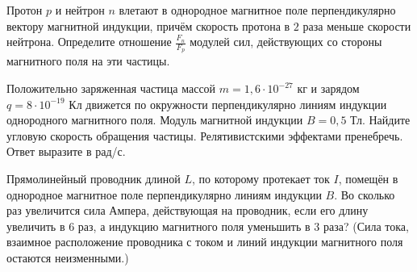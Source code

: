 \begin{taskbasic}[code={\label{task:elem_mag_proton_neutron_force}}]
Протон $p$ и нейтрон $n$ влетают в однородное магнитное поле перпендикулярно вектору магнитной индукции, причём скорость протона в $2$ раза меньше скорости нейтрона. Определите отношение $\frac{F_n}{F_p}$ модулей сил, действующих со стороны магнитного поля на эти частицы.

\end{taskbasic}

\begin{taskbasic}[code={\label{task:elem_mag_angular_velocity}}]
Положительно заряженная частица массой $m = 1{,}6 \cdot 10^{-27}\text{ кг}$ и зарядом $q = 8 \cdot 10^{-19}\text{ Кл}$ движется по окружности перпендикулярно линиям индукции однородного магнитного поля. Модуль магнитной индукции $B = 0{,}5\text{ Тл}$. Найдите угловую скорость обращения частицы. Релятивистскими эффектами пренебречь. Ответ выразите в рад/с.

\end{taskbasic}

\begin{taskbasic}[code={\label{task:elem_mag_ampere_force_change}}]
Прямолинейный проводник длиной $L$, по которому протекает ток $I$, помещён в однородное магнитное поле перпендикулярно линиям индукции $B$. Во сколько раз увеличится сила Ампера, действующая на проводник, если его длину увеличить в $6$ раз, а индукцию магнитного поля уменьшить в $3$ раза? (Сила тока, взаимное расположение проводника с током и линий индукции магнитного поля остаются неизменными.)

\end{taskbasic}

